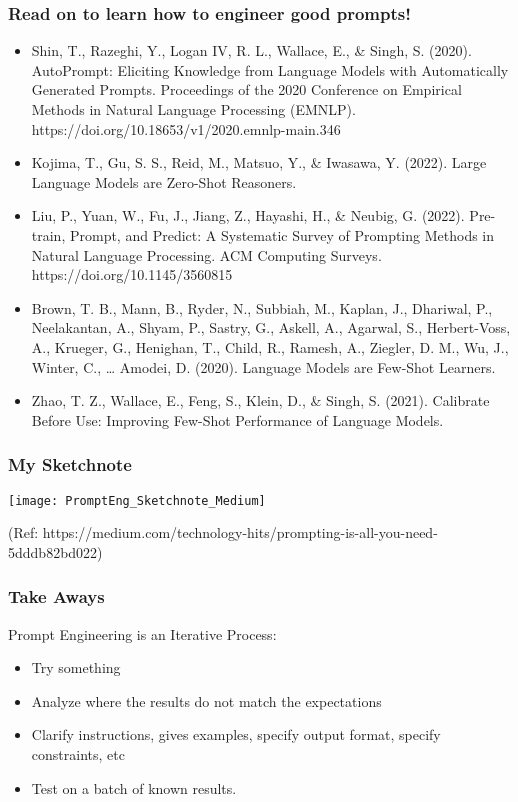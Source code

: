 \begin{frame}[fragile]\frametitle{Read on to learn how to engineer good prompts!}

\begin{itemize}
\item Shin, T., Razeghi, Y., Logan IV, R. L., Wallace, E., \& Singh, S. (2020). AutoPrompt: Eliciting Knowledge from Language Models with Automatically Generated Prompts. Proceedings of the 2020 Conference on Empirical Methods in Natural Language Processing (EMNLP). https://doi.org/10.18653/v1/2020.emnlp-main.346 
\item Kojima, T., Gu, S. S., Reid, M., Matsuo, Y., \& Iwasawa, Y. (2022). Large Language Models are Zero-Shot Reasoners. 
\item Liu, P., Yuan, W., Fu, J., Jiang, Z., Hayashi, H., \& Neubig, G. (2022). Pre-train, Prompt, and Predict: A Systematic Survey of Prompting Methods in Natural Language Processing. ACM Computing Surveys. https://doi.org/10.1145/3560815 
\item Brown, T. B., Mann, B., Ryder, N., Subbiah, M., Kaplan, J., Dhariwal, P., Neelakantan, A., Shyam, P., Sastry, G., Askell, A., Agarwal, S., Herbert-Voss, A., Krueger, G., Henighan, T., Child, R., Ramesh, A., Ziegler, D. M., Wu, J., Winter, C., … Amodei, D. (2020). Language Models are Few-Shot Learners. 
\item Zhao, T. Z., Wallace, E., Feng, S., Klein, D., \& Singh, S. (2021). Calibrate Before Use: Improving Few-Shot Performance of Language Models.
\end{itemize}
\end{frame}



\begin{frame}[fragile]\frametitle{My Sketchnote}

\begin{center}
\texttt{[image: PromptEng\_Sketchnote\_Medium]}

{\tiny (Ref: https://medium.com/technology-hits/prompting-is-all-you-need-5dddb82bd022)}
\end{center}		

\end{frame}


\begin{frame}[fragile]\frametitle{Take Aways}

Prompt Engineering is an Iterative Process:

\begin{itemize}
\item Try something
\item Analyze where the results do not match the expectations
\item Clarify instructions, gives examples, specify output format, specify constraints, etc
\item Test on a batch of known results.
\end{itemize}
\end{frame}

